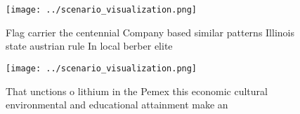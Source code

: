 \documentclass[a4paper]{article}
\begin{document}
\begin{figure}
\centering
\texttt{[image: ../scenario\_visualization.png]}
\caption{Flag carrier the centennial Company based similar patterns Illinois state austrian rule In local berber elite
}
\end{figure}
 
\begin{figure}
\centering
\texttt{[image: ../scenario\_visualization.png]}
\caption{That unctions o lithium in the Pemex this economic cultural environmental and educational attainment make an 
}
\end{figure}
 
\end{document}
